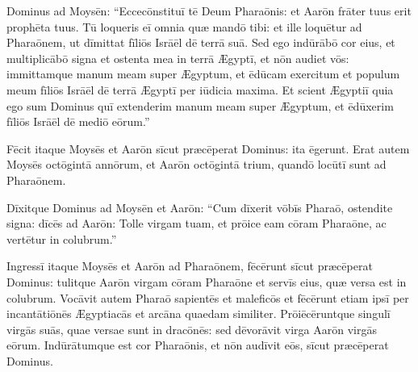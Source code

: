 

\thispagestyle{empty}

 Dominus ad Moysēn: ``Ecce\linebreak cōnstituī tē Deum
Pharaōnis: et Aarōn frāter tuus erit
prophēta tuus. Tū loqueris eī omnia quæ
mandō tibi: et ille loquētur ad Pharaōnem,
ut dīmittat fīliōs Isrāēl dē terrā suā. Sed ego
indūrābō cor eius, et
multiplicābō signa et ostenta mea
in terrā Ægyptī, et nōn audiet vōs: immittamque manum meam super Ægyptum, et ēdūcam exercitum et
populum meum fīliōs Isrāēl dē terrā Ægyptī per
iūdicia maxima. Et scient Ægyptiī quia ego sum Dominus
quī extenderim manum meam super Ægyptum, et ēdūxerim fīliōs
Isrāēl dē mediō eōrum.''

Fēcit itaque
Moysēs et Aarōn sīcut præcēperat
Dominus: ita ēgerunt. Erat autem Moysēs octōgintā
annōrum, et Aarōn octōgintā trium, quandō locūtī sunt ad
Pharaōnem.

Dīxitque Dominus ad Moysēn et
Aarōn: ``Cum dīxerit vōbīs Pharaō, ostendite signa: dīcēs
ad Aarōn: Tolle virgam tuam, et prōice eam cōram
Pharaōne, ac vertētur in colubrum.''

Ingressī itaque Moysēs et Aarōn ad Pharaōnem, fēcērunt sīcut
præcēperat Dominus: tulitque Aarōn virgam cōram
Pharaōne et servīs eius, quæ versa est in
colubrum. Vo\-cāvit autem Pharaō sapientēs
et maleficōs et fēcērunt etiam ipsī per
incantātiōnēs Ægyptiacās et
arcāna quaedam similiter. Prōiē\-cēruntque
singulī virgās suās, quae versae sunt in dracōnēs: sed
dēvorāvit virga Aarōn virgās eōrum.  Indūrātumque est cor Pharaōnis, et nōn audīvit eōs,
sīcut præcēperat Dominus.

